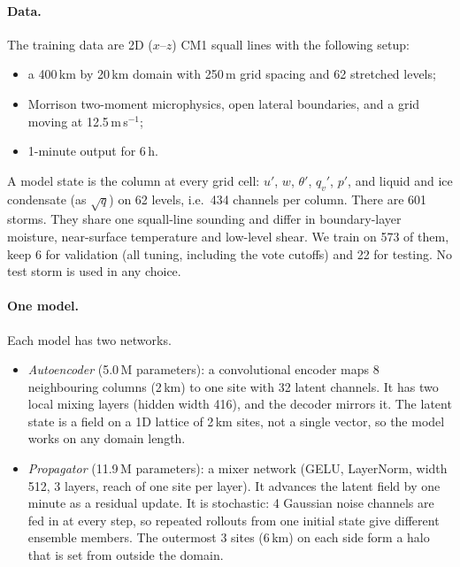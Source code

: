 \documentclass[11pt]{article}
\begin{document}
\paragraph{Data.} The training data are 2D ($x$--$z$) CM1 squall lines with the following setup:
\begin{itemize}
\item a 400\,km by 20\,km domain with 250\,m grid spacing and 62 stretched levels;
\item Morrison two-moment microphysics, open lateral boundaries, and a grid moving at 12.5\,m\,s$^{-1}$;
\item 1-minute output for 6\,h.
\end{itemize}
A model state is the column at every grid cell: $u'$, $w$, $\theta'$, $q_v'$, $p'$, and liquid and ice condensate (as $\sqrt{q}$) on 62 levels, i.e.\ 434 channels per column. There are 601 storms. They share one squall-line sounding and differ in boundary-layer moisture, near-surface temperature and low-level shear. We train on 573 of them, keep 6 for validation (all tuning, including the vote cutoffs) and 22 for testing. No test storm is used in any choice.

\paragraph{One model.} Each model has two networks.
\begin{itemize}
\item \emph{Autoencoder} (5.0\,M parameters): a convolutional encoder maps 8 neighbouring columns (2\,km) to one site with 32 latent channels. It has two local mixing layers (hidden width 416), and the decoder mirrors it. The latent state is a field on a 1D lattice of 2\,km sites, not a single vector, so the model works on any domain length.
\item \emph{Propagator} (11.9\,M parameters): a mixer network (GELU, LayerNorm, width 512, 3 layers, reach of one site per layer). It advances the latent field by one minute as a residual update. It is stochastic: 4 Gaussian noise channels are fed in at every step, so repeated rollouts from one initial state give different ensemble members. The outermost 3 sites (6\,km) on each side form a halo that is set from outside the domain.
\end{itemize}
\end{document}
